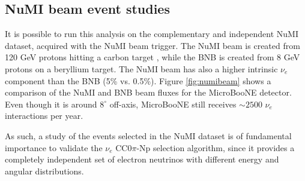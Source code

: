 

\subsection{NuMI beam event studies}
It is possible to run this analysis on the complementary and independent NuMI dataset, acquired with the NuMI beam trigger. The NuMI beam is created from 120 GeV protons hitting a carbon target \cite{Adamson:2015dkw}, while the BNB is created from 8 GeV protons on a beryllium target. The NuMI beam has also a higher intrinsic $\nu_{e}$ component than the BNB (5\% vs. 0.5\%). Figure \ref{fig:numibeam} shows a comparison of the NuMI and BNB beam fluxes for the MicroBooNE detector. Even though it is around $8^{\circ}$ off-axis, MicroBooNE still receives $\sim2500$ $\nu_{e}$ interactions per year. 

As such, a study of the events selected in the NuMI dataset is of fundamental importance to validate the $\nu_{e}$ CC0$\pi$-Np selection algorithm, since it provides a completely independent set of electron neutrinos with different energy and angular distributions.

